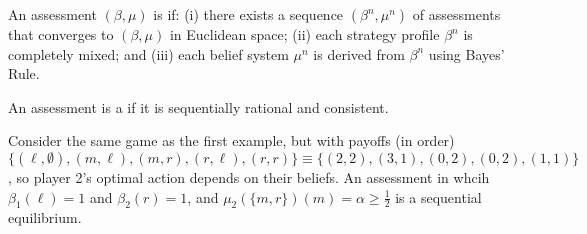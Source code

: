 \documentclass[10pt]{article}
\begin{document}
\begin{definition}
	An assessment $(\beta,\mu)$ is  if: (i) there exists a sequence $(\beta^n,\mu^n)$ of assessments that converges to $(\beta,\mu)$ in Euclidean space; (ii) each strategy profile $\beta^n$ is completely mixed; and (iii) each belief system $\mu^n$ is derived from $\beta^n$ using Bayes' Rule.
\end{definition}

\begin{proposition}
	An assessment is a  if it is sequentially rational and consistent.
\end{proposition}

\begin{example}
	Consider the same game as the first example, but with payoffs (in order) \[\{(\ell,\emptyset), (m,\ell) , (m,r) , (r,\ell),(r,r)\} \equiv \{(2,2), (3,1),(0,2),(0,2),(1,1)\}\], so player 2's optimal action depends on their beliefs. An assessment in whcih $\beta_1(\ell) = 1$ and $\beta_2(r) = 1$, and $\mu_2(\{m,r\})(m) = \alpha \ge \frac{1}{2}$ is a sequential equilibrium. 
\end{example}
\end{document}
